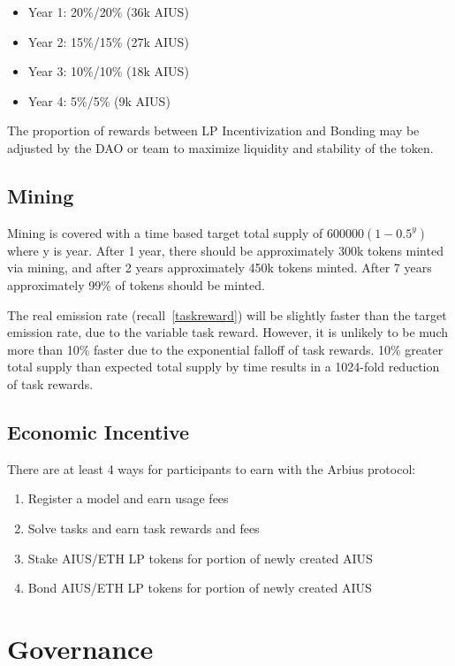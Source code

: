 \documentclass{article}
\begin{document}
\begin{itemize}
    \item Year 1: 20\%/20\% (36k AIUS)
    \item Year 2: 15\%/15\% (27k AIUS)
    \item Year 3: 10\%/10\% (18k AIUS)
    \item Year 4: 5\%/5\% (9k AIUS)
\end{itemize}

The proportion of rewards between LP Incentivization and Bonding may be adjusted by the DAO or team to maximize liquidity and stability of the token.


\subsection{Mining}

Mining is covered with a time based target total supply of $600000(1-{0.5^{y}})$ where y is year. After 1 year, there should be approximately 300k tokens minted via mining, and after 2 years approximately 450k tokens minted. After 7 years approximately 99\% of tokens should be minted.

The real emission rate (recall~\ref{taskreward}) will be slightly faster than the target emission rate, due to the variable task reward. However, it is unlikely to be much more than 10\% faster due to the exponential falloff of task rewards. 10\% greater total supply than expected total supply by time results in a 1024-fold reduction of task rewards.

\subsection{Economic Incentive}

There are at least 4 ways for participants to earn with the Arbius protocol:

\begin{enumerate}
    \item Register a model and earn usage fees
    \item Solve tasks and earn task rewards and fees
    \item Stake AIUS/ETH LP tokens for portion of newly created AIUS
    \item Bond AIUS/ETH LP tokens for portion of newly created AIUS
\end{enumerate}


\section{Governance}
\end{document}
